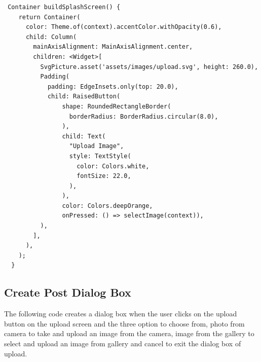 \begin{verbatim}
 Container buildSplashScreen() {
    return Container(
      color: Theme.of(context).accentColor.withOpacity(0.6),
      child: Column(
        mainAxisAlignment: MainAxisAlignment.center,
        children: <Widget>[
          SvgPicture.asset('assets/images/upload.svg', height: 260.0),
          Padding(
            padding: EdgeInsets.only(top: 20.0),
            child: RaisedButton(
                shape: RoundedRectangleBorder(
                  borderRadius: BorderRadius.circular(8.0),
                ),
                child: Text(
                  "Upload Image",
                  style: TextStyle(
                    color: Colors.white,
                    fontSize: 22.0,
                  ),
                ),
                color: Colors.deepOrange,
                onPressed: () => selectImage(context)),
          ),
        ],
      ),
    );
  }

\end{verbatim}

\subsection{Create Post Dialog Box}
The following code creates a dialog box when the user clicks on the upload button on the upload screen and the three option to choose from, photo from camera to take and upload an image from the camera, image from the gallery to select and upload an image from gallery and cancel to exit the dialog box of upload.

